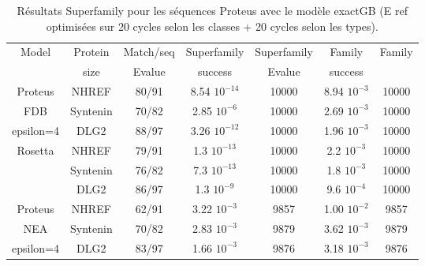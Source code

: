 \begin{table}[h]
  \raggedleft{}
  
  \begin{tabular}{ccccccc}
    
    \toprule
    Model &Protein & Match/seq & Superfamily & Superfamily & Family & Family \\
            & size      & Evalue      & success     & Evalue & success\\
    \cmidrule{1-7}
    Proteus                   & NHREF     & 80/91  &  8.54 $10^{-14}$  & 10000  & 8.94 $10^{-3}$ & 10000 \\
    FDB                       & Syntenin  & 70/82  &  2.85 $10^{-6}$   & 10000  & 2.69 $10^{-3}$ & 10000 \\
    epsilon=4                 & DLG2      & 88/97  &  3.26 $10^{-12}$  & 10000  & 1.96 $10^{-3}$ & 10000 \\
    \cmidrule{1-7}
    \multirow{3}{*}{Rosetta}  & NHREF     & 79/91  &  1.3 $10^{-13}$ & 10000    & 2.2 $10^{-3}$ & 10000 \\
                              & Syntenin  & 76/82  &  7.3 $10^{-13}$ & 10000    & 1.8 $10^{-3}$ & 10000 \\
                              & DLG2      & 86/97  &  1.3 $10^{-9}$  & 10000    & 9.6 $10^{-4}$ & 10000 \\    
    \cmidrule{1-7}
    Proteus                   & NHREF     & 62/91 &   3.22 $10^{-3}$  & 9857    & 1.00 $10^{-2}$ & 9857 \\
    NEA                       & Syntenin  & 70/82 &   2.83 $10^{-3}$  & 9879    & 3.62 $10^{-3}$ & 9879 \\
    epsilon=4                 & DLG2      & 83/97 &   1.66 $10^{-3}$  & 9876    & 3.18 $10^{-3}$ & 9876 \\ 
    \bottomrule        
  \end{tabular}   
  \caption{Résultats Superfamily pour les séquences Proteus avec le modèle exactGB (E ref optimisées sur 20 cycles selon les classes + 20 cycles selon les types).}   
  \label{tab:superfamily_model_B6}       
\end{table}


